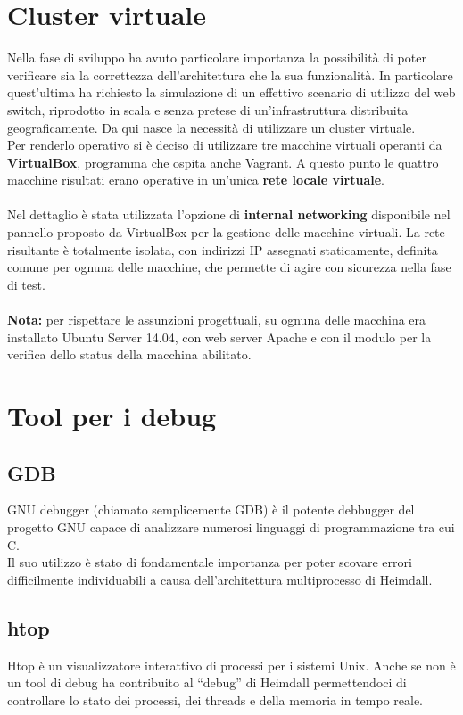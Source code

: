 \documentclass[italian]{tktltiki2}
\begin{document}
\newpage
\section{Cluster virtuale}
Nella fase di sviluppo ha avuto particolare importanza la possibilità di poter verificare sia la correttezza dell'architettura che la sua funzionalità. In particolare quest'ultima ha richiesto la simulazione di un effettivo scenario di utilizzo del web switch, riprodotto in scala e senza pretese di un'infrastruttura distribuita geograficamente. Da qui nasce la necessità di utilizzare un cluster virtuale.\\
Per renderlo operativo si è deciso di utilizzare tre macchine virtuali operanti da \textbf{VirtualBox}\cite{virtualbox}, programma che ospita anche Vagrant. A questo punto le quattro macchine risultati erano operative in un'unica \textbf{rete locale virtuale}. \\\\
Nel dettaglio è stata utilizzata l'opzione di \textbf{internal networking} disponibile nel pannello proposto da VirtualBox per la gestione delle macchine virtuali. La rete risultante è totalmente isolata, con indirizzi IP assegnati staticamente, definita comune per ognuna delle macchine, che permette di agire con sicurezza nella fase di test. \\\\
\textbf{Nota: } per rispettare le assunzioni progettuali, su ognuna delle macchina era installato Ubuntu Server 14.04, con web server Apache e con il modulo per la verifica dello status della macchina abilitato.

\newpage
\section{Tool per i debug}
\subsection{GDB}
GNU debugger (chiamato semplicemente GDB)\cite{gdb} è il potente debbugger del progetto GNU capace di analizzare numerosi linguaggi di programmazione tra cui C.
\\
Il suo utilizzo è stato di fondamentale importanza per poter scovare errori difficilmente individuabili a causa dell'architettura multiprocesso di Heimdall.

\subsection{htop}
Htop\cite{htop} è un visualizzatore interattivo di processi per i sistemi Unix. Anche se non è un tool di debug ha contribuito al ``debug'' di Heimdall permettendoci di controllare lo stato dei processi, dei threads e della memoria in tempo reale.
\end{document}
